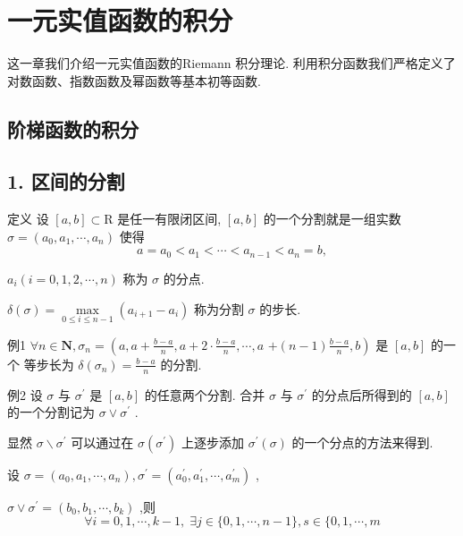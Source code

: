 \chapter{一元实值函数的积分}

这一章我们介绍一元实值函数的Riemann 积分理论. 利用积分函数我们严格定义了对数函数、指数函数及幂函数等基本初等函数.

\section{阶梯函数的积分}

\section*{1. 区间的分割}

定义 设 $\left\lbrack  {a,b}\right\rbrack   \subset  \mathrm{R}$ 是任一有限闭区间, $\left\lbrack  {a,b}\right\rbrack$ 的一个分割就是一组实数 $\sigma  = \left( {{a}_{0},{a}_{1},\cdots ,{a}_{n}}\right)$ 使得
$$a = {a}_{0} < {a}_{1} < \cdots  < {a}_{n - 1} < {a}_{n} = b,$$

${a}_{i}\left( {i = 0,1,2,\cdots ,n}\right)$ 称为 $\sigma$ 的分点.

$\delta \left( \sigma \right)  = \mathop{\max }\limits_{{0 \leq  i \leq  n - 1}}\left( {{a}_{i + 1} - {a}_{i}}\right)$ 称为分割 $\sigma$ 的步长.

例1 $\forall n \in  \mathbf{N},{\sigma }_{n} = \left( {a,a + \frac{b - a}{n},a + 2 \cdot  \frac{b - a}{n},\cdots ,a}\right.$  $\left. {+\left( {n - 1}\right) \frac{b - a}{n},b}\right)$ 是 $\left\lbrack  {a,b}\right\rbrack$ 的一个 等步长为 $\delta \left( {\sigma }_{n}\right)  = \frac{b - a}{n}$ 的分割.

例2 设 $\sigma$ 与 ${\sigma }^{\prime }$ 是 $\left\lbrack  {a,b}\right\rbrack$ 的任意两个分割. 合并 $\sigma$ 与 ${\sigma }^{\prime }$ 的分点后所得到的 $\left\lbrack  {a,b}\right\rbrack$ 的一个分割记为 $\sigma  \vee  {\sigma }^{\prime }$ .

显然 $\sigma  \smallsetminus  {\sigma }^{\prime }$ 可以通过在 $\sigma \left( {\sigma }^{\prime }\right)$ 上逐步添加 ${\sigma }^{\prime }\left( \sigma \right)$ 的一个分点的方法来得到.

设 $\sigma  = \left( {{a}_{0},{a}_{1},\cdots ,{a}_{n}}\right) ,{\sigma }^{\prime } = \left( {{a}_{0}^{\prime },{a}_{1}^{\prime },\cdots ,{a}_{m}^{\prime }}\right)$ ,

$\sigma  \vee  {\sigma }^{\prime } = \left( {{b}_{0},{b}_{1},\cdots ,{b}_{k}}\right)$ ,则
$$\forall i = 0,1,\cdots ,k - 1,\;\exists j \in  \{ 0,1,\cdots ,n - 1\} ,s \in  \{ 0,1,\cdots ,m$$

